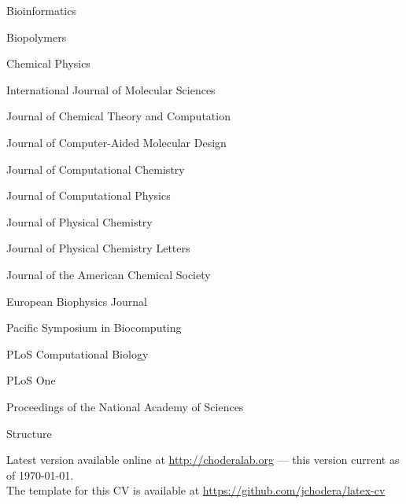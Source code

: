 \documentclass[10pt]{article}
\begin{document}
Bioinformatics

Biopolymers

Chemical Physics

International Journal of Molecular Sciences

Journal of Chemical Theory and Computation

Journal of Computer-Aided Molecular Design

Journal of Computational Chemistry

Journal of Computational Physics

Journal of Physical Chemistry

Journal of Physical Chemistry Letters

Journal of the American Chemical Society

European Biophysics Journal

Pacific Symposium in Biocomputing

PLoS Computational Biology

PLoS One

Proceedings of the National Academy of Sciences

Structure

\vfill{}
\hrulefill

\begin{center}
{\footnotesize 
Latest version available online at \href{http://www.choderalab.org}{http://choderalab.org} --- this version current as of \today.\\
The template for this CV is available at \href{https://github.com/jchodera/latex-cv}{https://github.com/jchodera/latex-cv}}
\end{center}
\end{document}
